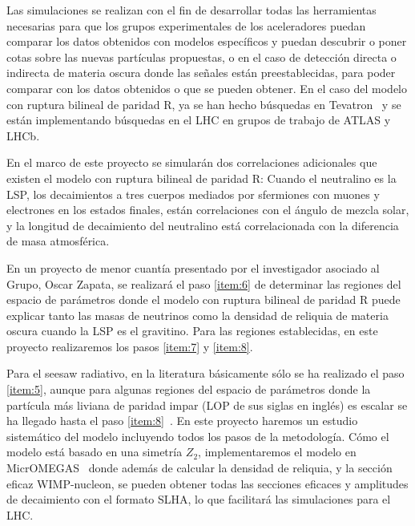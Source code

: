 Las simulaciones se realizan con el fin de desarrollar todas las
herramientas necesarias para que los grupos experimentales de los
aceleradores puedan comparar los datos obtenidos con modelos
específicos y puedan descubrir o poner cotas sobre las nuevas
partículas propuestas, o en el caso de detección directa o indirecta
de materia oscura donde las señales están preestablecidas, para poder
comparar con los datos obtenidos o que se pueden obtener. En el caso
del modelo con ruptura bilineal de paridad R, ya se han hecho
búsquedas en Tevatron~\cite{0802.3887} y se están implementando 
búsquedas en el LHC en grupos de trabajo de ATLAS y LHCb.

\begin{proyecto}
  En el marco de este proyecto se simularán dos correlaciones
  adicionales que existen el modelo con ruptura bilineal de paridad R:
  Cuando el neutralino es la LSP, los decaimientos a tres cuerpos
  mediados por sfermiones con muones y electrones en los estados
  finales, están correlaciones con el ángulo de mezcla solar, y la
  longitud de decaimiento del neutralino está correlacionada con la
  diferencia de masa atmosférica.
\end{proyecto}

\begin{proyecto}
  En un proyecto de menor cuantía presentado por el investigador
  asociado al Grupo, Oscar Zapata, se realizará el paso \ref{item:6}
  de determinar las regiones del espacio de parámetros donde el modelo
  con ruptura bilineal de paridad R puede explicar tanto las masas de
  neutrinos como la densidad de reliquia de materia oscura cuando la
  LSP es el gravitino. Para las regiones establecidas, en este proyecto realizaremos los pasos \ref{item:7} y \ref{item:8}.
\end{proyecto}


\begin{proyecto}
  Para el seesaw radiativo, en la literatura básicamente sólo se ha
  realizado el paso \ref{item:5}, aunque para algunas regiones del
  espacio de parámetros donde la partícula más liviana de paridad
  impar (LOP de sus siglas en inglés) es escalar se ha llegado hasta
  el paso \ref{item:8}~\cite{0708.2839}. En este proyecto haremos un
  estudio sistemático del modelo incluyendo todos los pasos de la
  metodología. Cómo el modelo está basado en una simetría $Z_2$,
  implementaremos el modelo en MicrOMEGAS~\cite{1004.1092} donde
  además de calcular la densidad de reliquia, y la sección eficaz
  WIMP-nucleon, se pueden obtener todas las secciones eficaces y
  amplitudes de decaimiento con el formato SLHA, lo que facilitará las
  simulaciones para el LHC.
\end{proyecto}

